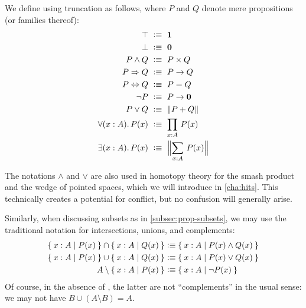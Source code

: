 \begin{defn} \label{defn:logical-notation}
  We define 
  using truncation as follows, where $P$ and $Q$ denote mere propositions (or families thereof):
  {\allowdisplaybreaks
  \begin{align*}
    \top            &\ \defeq \ \unit \\
    \bot            &\ \defeq \ \emptyt \\
    P \land Q       &\ \defeq \ P \times Q \\
    P \Rightarrow Q &\ \defeq \ P \to Q \\
    P \Leftrightarrow Q &\ \defeq \ P = Q \\
    \neg P          &\ \defeq \ P \to \emptyt \\
    P \lor Q        &\ \defeq \ \brck{P + Q} \\
    \fall{x : A} P(x) &\ \defeq \ \prd{x : A} P(x) \\
    \exis{x : A} P(x) &\ \defeq \ \Brck{\sm{x : A} P(x)}
  \end{align*}}
\end{defn}

The notations $\land$ and $\lor$ are also used in homotopy theory for the smash product and the wedge of pointed spaces, which we will introduce in \autoref{cha:hits}.
This technically creates a potential for conflict, but no confusion will generally arise.

Similarly, when discussing subsets as in \autoref{subsec:prop-subsets}, we may use the traditional notation for intersections, unions, and complements:
%
%
%
%
%
%
\begin{align*}
  \Set{x:A | P(x)} \cap \Set{x:A | Q(x)}
  &\vcentcolon\equiv \Set{x:A | P(x) \land Q(x)}\\
  \Set{x:A | P(x)} \cup \Set{x:A | Q(x)}
  &\vcentcolon\equiv \Set{x:A | P(x) \lor Q(x)}\\
  A \setminus \Set{x:A | P(x)}
  &\vcentcolon\equiv \Set{x:A | \neg P(x)}
\end{align*}
Of course, in the absence of \LEM{}, the latter are not ``complements'' in the usual sense: we may not have $B \cup (A\setminus B) = A$.


